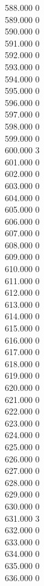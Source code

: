 { 588.000	0 \\
 589.000	0 \\
 590.000	0 \\
 591.000	0 \\
 592.000	0 \\
 593.000	0 \\
 594.000	0 \\
 595.000	0 \\
 596.000	0 \\
 597.000	0 \\
 598.000	0 \\
 599.000	0 \\
 600.000	3 \\
 601.000	0 \\
 602.000	0 \\
 603.000	0 \\
 604.000	0 \\
 605.000	0 \\
 606.000	0 \\
 607.000	0 \\
 608.000	0 \\
 609.000	0 \\
 610.000	0 \\
 611.000	0 \\
 612.000	0 \\
 613.000	0 \\
 614.000	0 \\
 615.000	0 \\
 616.000	0 \\
 617.000	0 \\
 618.000	0 \\
 619.000	0 \\
 620.000	0 \\
 621.000	0 \\
 622.000	0 \\
 623.000	0 \\
 624.000	0 \\
 625.000	0 \\
 626.000	0 \\
 627.000	0 \\
 628.000	0 \\
 629.000	0 \\
 630.000	0 \\
 631.000	3 \\
 632.000	0 \\
 633.000	0 \\
 634.000	0 \\
 635.000	0 \\
 636.000	0 \\
}
